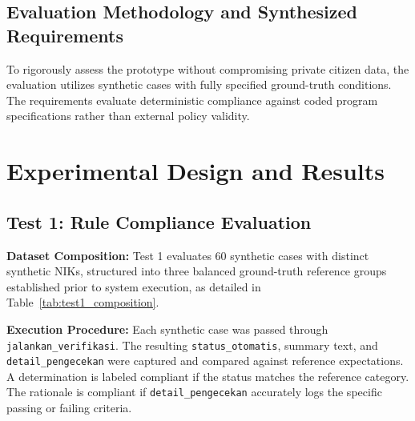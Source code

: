 \documentclass[runningheads]{llncs}
\begin{document}
\subsection{Evaluation Methodology and Synthesized Requirements}

To rigorously assess the prototype without compromising private citizen data, the evaluation utilizes synthetic cases with fully specified ground-truth conditions. The requirements evaluate deterministic compliance against coded program specifications rather than external policy validity.

\section{Experimental Design and Results}

\subsection{Test 1: Rule Compliance Evaluation}

\textbf{Dataset Composition:} Test 1 evaluates 60 synthetic cases with distinct synthetic NIKs, structured into three balanced ground-truth reference groups established prior to system execution, as detailed in Table~\ref{tab:test1_composition}.

\begin{table}[htbp]
\caption{Composition of synthetic cases for Test 1 ($N=60$)}
\label{tab:test1_composition}
\centering
{}
\end{table}

\noindent\textbf{Execution Procedure:} Each synthetic case was passed through \texttt{jalankan\_verifikasi}. The resulting \texttt{status\_otomatis}, summary text, and \texttt{detail\_pengecekan} were captured and compared against reference expectations. A determination is labeled compliant if the status matches the reference category. The rationale is compliant if \texttt{detail\_pengecekan} accurately logs the specific passing or failing criteria.
\end{document}

